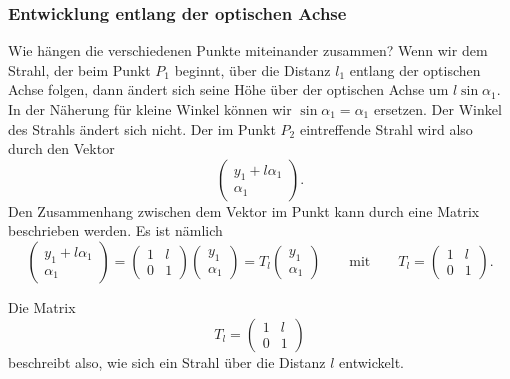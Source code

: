 \subsubsection{Entwicklung entlang der optischen Achse}
Wie hängen die verschiedenen Punkte miteinander zusammen?
Wenn wir dem Strahl, der beim Punkt $P_1$ beginnt, über die Distanz
$l_1$ entlang der optischen Achse folgen, dann ändert sich seine
Höhe über der optischen Achse um $l\sin\alpha_1$.
In der Näherung für kleine Winkel können wir $\sin\alpha_1=\alpha_1$
ersetzen.
Der Winkel des Strahls ändert sich nicht.
Der im Punkt $P_2$ eintreffende Strahl wird also durch den Vektor
\[
\begin{pmatrix}
y_1+l\alpha_1 \\\alpha_1
\end{pmatrix}.
\]
Den Zusammenhang zwischen dem Vektor im Punkt kann durch eine Matrix
beschrieben werden.
Es ist nämlich
\[
\begin{pmatrix}
y_1+l\alpha_1\\\alpha_1
\end{pmatrix}
=
\begin{pmatrix}
1&l\\0&1
\end{pmatrix}
\begin{pmatrix}
y_1\\\alpha_1
\end{pmatrix}
=
T_l
\begin{pmatrix}
y_1\\\alpha_1
\end{pmatrix}
\qquad
\text{mit}
\qquad
T_l
=
\begin{pmatrix}
1&l\\0&1
\end{pmatrix}.
\]

\begin{definition}
Die Matrix
\begin{equation}
T_l
=
\begin{pmatrix}
1&l\\0&1
\end{pmatrix}
\end{equation}
beschreibt also, wie sich ein Strahl über die Distanz
$l$ entwickelt.
\end{definition}

